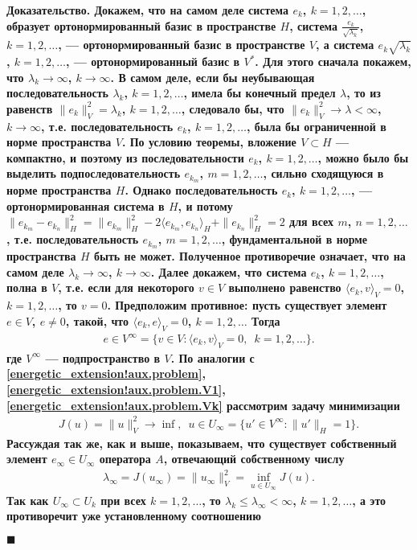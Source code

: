 \documentclass{report}
\newcounter{lem}[section]
\newenvironment{Proof}{\par\noindent\bf Доказательство.\rm}{ $\blacksquare$\par}
\begin{document}
\begin{Proof}
Докажем, что на самом деле система $e_k$, $k=1,2,\dots$, образует ортонормированный базис в пространстве $H$, система $\frac{e_k}{\sqrt{\lambda_k}}$, $k=1,2,\dots$, --- ортонормированный
базис в пространстве $V$, а система ${e_k}{\sqrt{\lambda_k}}$, $k=1,2,\dots$, --- ортонормированный базис в $V^*$. Для этого сначала покажем, что $\lambda_k\to\infty$, $k\to\infty$.
В самом деле, если бы неубывающая последовательность $\lambda_k$, $k=1,2,\dots$, имела бы конечный предел $\lambda$, то из равенств $\|e_k\|^2_V=\lambda_k$, $k=1,2,\dots$, следовало бы, что
$\|e_k\|^2_V\to\lambda<\infty$, $k\to\infty$, т.е. последовательность $e_k$, $k=1,2,\dots$, была бы ограниченной в норме пространства $V$. По условию теоремы, вложение $V\subset H$ ---
компактно, и поэтому из последовательности $e_k$, $k=1,2,\dots$, можно было бы выделить подпоследовательность $e_{k_m}$, $m=1,2,\dots$, сильно сходящуюся в норме пространства $H$. Однако
последовательность $e_k$, $k=1,2,\dots$, --- ортонормированная система в $H$, и потому $\|e_{k_m}-e_{k_n}\|^2_H=\|e_{k_m}\|^2_H-2\langle e_{k_m},e_{k_n}\rangle_H+\|e_{k_n}\|^2_H=2$ для
всех $m$, $n=1,2,\dots$, т.е. последовательность $e_{k_m}$, $m=1,2,\dots$, фундаментальной в норме пространства $H$ быть не может. Полученное противоречие означает, что на самом деле
$\lambda_k\to\infty$, $k\to\infty$. Далее докажем, что система $e_k$, $k=1,2,\dots$, полна в $V$, т.е. если для некоторого $v\in V$ выполнено равенство $\langle e_k,v\rangle_V=0$, $k=1,2,
\dots$, то $v=0$. Предположим противное: пусть существует элемент $e\in V$, $e\neq0$, такой, что  $\langle e_k,e\rangle_V=0$, $k=1,2,\dots$ Тогда
\begin{gather*}
e\in V^\infty=\{v\in V:\langle e_k,v\rangle_V=0,\,\,\,k=1,2,\dots\}.
\end{gather*}
где $V^\infty$ --- подпространство в $V$. По аналогии с \eqref{energetic_extension!aux.problem}, \eqref{energetic_extension!aux.problem.V1}, \eqref{energetic_extension!aux.problem.Vk}
рассмотрим задачу минимизации
\begin{gather*}
J(u)=\|u\|^2_V\to\inf,\,\,\,u\in U_\infty=\{u'\in V^\infty:\|u'\|_H=1\}.
\end{gather*}
Рассуждая так же, как и выше, показываем, что существует собственный элемент $e_\infty\in U_\infty$ оператора $A$, отвечающий собственному числу
\begin{gather*}
\lambda_\infty=J(u_\infty)=\|u_\infty\|^2_V=\inf\limits_{u\in U_\infty}J(u).
\end{gather*}
Так как $U_\infty\subset U_k$ при всех $k=1,2,\dots$, то $\lambda_k\leqslant\lambda_\infty<\infty$, $k=1,2,\dots$, а это противоречит уже установленному соотношению

\end{Proof}
\end{document}
